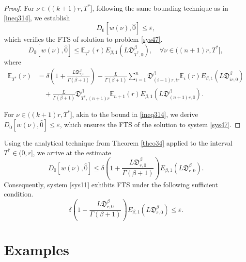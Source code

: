 \documentclass[reqno]{amsart}
\begin{document}
\begin{proof}
 For $\nu \in ((k+1) r, T^{*}]$, following the same bounding technique as in 
 \eqref{ineq314}, we establish
\[
D_0[ w(\nu ), \hat{0}] \leq \varepsilon,
\]
which verifies the FTS of solution to problem \eqref{sys47}.
\begin{equation}\label{ineq328}
D_0[ w(\nu ), \hat{0}] 
\leq \mathbb{E}_{T^{*}}( r) E_{\beta, 1}( L\mathfrak{D}_{T^{*},0}^{\beta}), \quad 
\forall \nu \in((n+1) r, T^{*}], 
\end{equation}
where
\begin{align*}
\mathbb{E}_{T^{*}}( r)
&=  \delta(1+\frac{ L\mathfrak{D}_{ r,0}^{\beta}}{\Gamma(\beta+1)})
+ \frac{ L}{\Gamma(\beta+1)} \sum_{i=1}^{n}\mathfrak{D}_{(i+1) r,i r}^{\beta}
 \mathbb{E}_{i}( r) E_{\beta, 1}( L\mathfrak{D}_{i r,0}^{\beta}) \\
&\quad +  \frac{ L}{\Gamma(\beta+1)}\mathfrak{D}_{T^{*},(n+1) r}^{\beta} 
\mathbb{E}_{n+1}( r) E_{\beta, 1}( L\mathfrak{D}_{(n+1) r,0}^{\beta}) .
\end{align*}


For $\nu \in ((k+1) r, T^{*}]$, akin to the bound in \eqref{ineq314}, we derive 
$D_0[ w(\nu ), \hat{0}] \leq \varepsilon$, which ensures the FTS of the solution 
to system \eqref{sys47}.
\end{proof}

\begin{remark}\label{rem31} \rm
Using the analytical technique from Theorem \ref{theo34} applied to the interval 
\( T^{*} \in (0, r] \), we arrive at the  estimate
$$
D_0[ w(\nu ), \hat{0}] 
\leq \delta(1+\frac{ L\mathfrak{D}_{ r,0}^{\beta}}{\Gamma(\beta+1)}) E_{\beta, 1}
( L\mathfrak{D}_{ r,0}^{\beta}) .
$$
Consequently, system \eqref{sys11} exhibits FTS under the following sufficient 
condition.
\begin{equation}\label{ineq329}
\delta(1+\frac{ L\mathfrak{D}_{ r,0}^{\beta}}{\Gamma(\beta+1)}) E_{\beta, 1}
( L\mathfrak{D}_{ r,0}^{\beta}) \leq \varepsilon .
\end{equation}
\end{remark}

\section{Examples}
\end{document}
